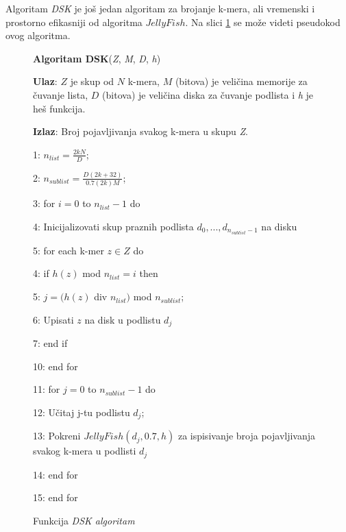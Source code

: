 \documentclass[12pt,oneside]{memoir}
\begin{document}
Algoritam \textit{DSK} je još jedan algoritam za brojanje k-mera, ali vremenski i prostorno efikasniji od algoritma $JellyFish$. Na slici \ref{box:DSK} se može videti pseudokod ovog algoritma.

\begin{comment}

\begin{figure}[h]
\centering
\texttt{[image: DSK5\_11.PNG]}
\caption{DSK algoritam \cite{WingKinSung}}
\label{fig:DSK}
\end{figure}

\end{comment}

\begin{figure}[!ht]
\begin{tcolorbox}
\textbf{Algoritam DSK}(\textit{Z}, \textit{M}, \textit{D}, \textit{h})

\textbf{Ulaz}: $Z$ je skup od $N$ k-mera, $M$ (bitova) je veličina memorije za čuvanje lista, $D$ (bitova) je veličina diska za čuvanje podlista i \textit{h} je heš funkcija.

\textbf{Izlaz}: Broj pojavljivanja svakog k-mera u skupu \textit{Z}.

1: $n_{list} = \frac{2kN}{D}$;

2: $n_{sublist} = \frac{D(2k + 32)}{0.7(2k)M}$;

3: for $i = 0$ to $n_{list} - 1$ do

4:\hspace{1cm} Inicijalizovati skup praznih podlista ${d_0,..., d_{n_{sublist} - 1}}$ na disku

5:\hspace{1cm} for each k-mer $z \in Z$ do

4:\hspace{2cm} if $h(z)$ mod $n_{list} = i$ then

5:\hspace{3cm} $j = (h(z)$ div $n_{list})$ mod $n_{sublist}$;

6:\hspace{3cm} Upisati $z$ na disk u podlistu $d_j$

7:\hspace{2cm} end if

10:\hspace{1cm} end for

11:\hspace{1cm} for $j = 0$ to $n_{sublist} - 1$ do

12:\hspace{2cm} Učitaj j-tu podlistu $d_j$;

13:\hspace{2cm} Pokreni $JellyFish(d_j, 0.7, h)$ za ispisivanje broja pojavljivanja svakog k-mera u podlisti $d_j$

14:\hspace{1cm} end for

15: end for
\end{tcolorbox}
\caption{Funkcija \textit{DSK algoritam} \cite{WingKinSung}}
\label{box:DSK}
\end{figure}
\end{document}
